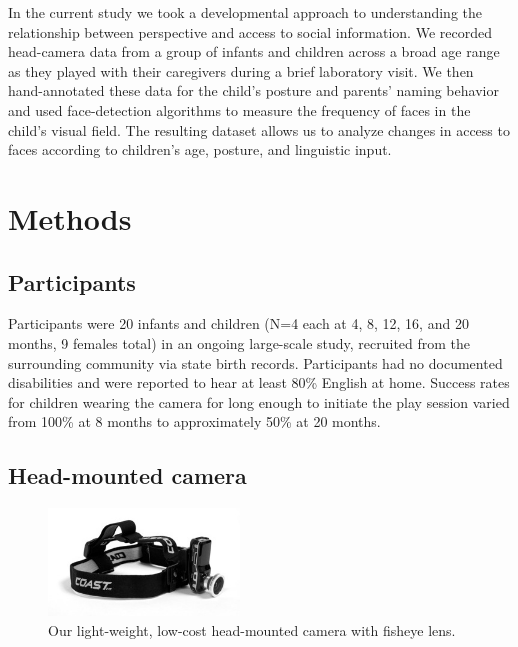 \documentclass[10pt,letterpaper]{article}
\begin{document}
In the current study we took a developmental approach to understanding the relationship between perspective and access to social information. We recorded head-camera data from a group of infants and children across a broad age range as they played with their caregivers during a brief laboratory visit. We then hand-annotated these data for the child's posture and parents' naming behavior and used face-detection algorithms to measure the frequency of faces in the child's visual field.  The resulting dataset allows us to analyze changes in access to faces according to children's age, posture, and linguistic input. 

\section{Methods}

\subsection{Participants}

Participants were 20 infants and children (N=4 each at 4, 8, 12, 16, and 20 months, 9 females total) in an ongoing large-scale study, recruited from the surrounding community via state birth records. Participants had no documented disabilities and were reported to hear at least 80\% English at home. Success rates for children wearing the camera for long enough to initiate the play session varied from 100\% at 8 months to approximately 50\% at 20 months. 


\subsection{Head-mounted camera}

\begin{figure}
\centering
\includegraphics[width=2in]{figures/headcam_w_fisheye3.jpg}
\caption{\label{fig:headcam} Our light-weight, low-cost head-mounted camera with fisheye lens.} 
\end{figure}
\end{document}
